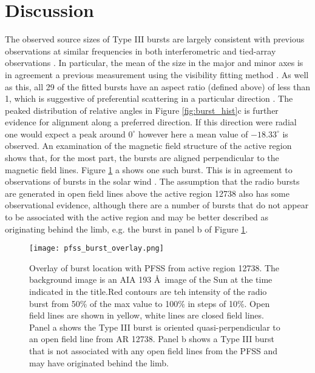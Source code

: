 \section{Discussion}
\label{sec:obsvtheory_discussion}
The observed source sizes of Type III bursts are largely consistent with previous observations at similar frequencies in both interferometric and tied-array observations \citep{Kontar2017, Zhang2020}. In particular, the mean of the size in the major and minor axes is in agreement a previous measurement using the visibility fitting method \citep{Murphy2021}. As well as this, all 29 of the fitted bursts have an aspect ratio (defined above) of less than 1, which is suggestive of preferential scattering in a particular direction \citep{Anantharamaiah1994, Bastian1994}. The peaked distribution of relative angles in Figure \ref{fig:burst_hist}c is further evidence for alignment along a preferred direction. If this direction were radial one would expect a peak around $0^\circ$ however here a mean value of $-18.33^\circ$ is observed. An examination of the magnetic field structure of the active region shows that, for the most part, the bursts are aligned perpendicular to the magnetic field lines. Figure \ref{fig:pfss_overlay} a shows one such burst. This is in agreement to observations of bursts in the solar wind \citep{Anantharamaiah1994, SasikumarRaja2016}. The assumption that the radio bursts are generated in open field lines above the active region 12738 also has some observational evidence, although there are a number of bursts that do not appear to be associated with the active region and may be better described as originating behind the limb, e.g. the burst in panel b of Figure \ref{fig:pfss_overlay}. %

\begin{figure}[ht]
\centering
\texttt{[image: pfss\_burst\_overlay.png]}
\caption[Overlay of burst location with PFSS from active region 12738]{Overlay of burst location with PFSS from active region 12738. The background image is an AIA 193 \AA \ image of the Sun at the time indicated in the title.Red contours are teh intensity of the radio burst from 50\% of the max value to 100\% in steps of 10\%. Open field lines are shown in yellow, white lines are closed field lines. Panel a shows the Type III burst is oriented quasi-perpendicular to an open field line from AR 12738. Panel b shows a Type III burst that is not associated with any open field lines from the PFSS and may have originated behind the limb.}
\label{fig:pfss_overlay}
\end{figure}

